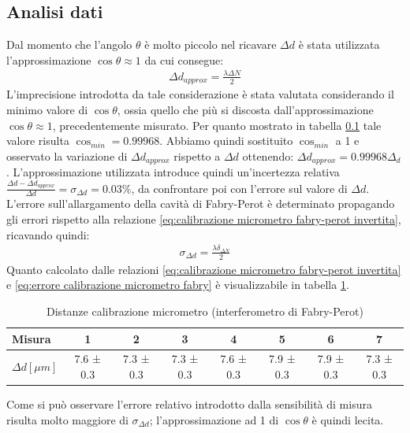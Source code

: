 \documentclass[a4paper]{article}
\begin{document}
\subsection{Analisi dati}
Dal momento che l'angolo $\theta$ è molto piccolo nel ricavare $\Delta d$ è stata utilizzata l'approssimazione $\cos{\theta}\approx1$ da cui consegue:
\begin{align}
    \Delta d_{approx} = \frac{\lambda \Delta N}{2}
\label{eq:calibrazione micrometro fabry-perot invertita}
\end{align}
L'imprecisione introdotta da tale considerazione è stata valutata considerando il minimo valore di $\cos{\theta}$, ossia quello che più si discosta dall'approssimazione $\cos{\theta}\approx1$, precedentemente misurato. Per quanto mostrato in tabella \ref{} tale valore risulta $\cos_{min}=0.99968$.
Abbiamo quindi sostituito $\cos_{min}$ a 1 e osservato la variazione di $\Delta d_{approx}$ rispetto a $\Delta d$ ottenendo: $\Delta d_{approx} = 0.99968\Delta_d$. L'approssimazione utilizzata introduce quindi un'incertezza relativa $\frac{\Delta d- \Delta d_{approx}}{\Delta d}=\sigma_{\Delta d}=0.03\%$, da confrontare poi con l'errore sul valore di $\Delta d$.
L'errore sull'allargamento della cavità di Fabry-Perot è determinato propagando gli errori rispetto alla relazione \ref{eq:calibrazione micrometro fabry-perot invertita}, ricavando quindi:
\begin{align}
   \sigma_{\Delta d}= \frac{\lambda \delta_{\Delta N}}{2}
\label{eq:errore calibrazione micrometro fabry}
\end{align}
Quanto calcolato dalle relazioni \ref{eq:calibrazione micrometro fabry-perot invertita} e \ref{eq:errore calibrazione micrometro fabry} è visualizzabile in tabella \ref{tab: distanze calibrazione fabry-perot}.
\begin{table}[htbp]
\centering
\caption{Distanze calibrazione micrometro (interferometro di Fabry-Perot)}
\begin{tabular}{|l|ccccccc|}
\hline
Misura & 1 & 2 & 3 & 4 & 5 & 6 & 7 \\\hline\hline
$\Delta d [\mu m]$ & 7.6 ± 0.3  & 7.3 ± 0.3  & 7.3 ± 0.3  & 7.6 ± 0.3  & 7.9 ± 0.3 & 7.9 ± 0.3 & 7.3 ± 0.3 \\\hline
\end{tabular}
\label{tab: distanze calibrazione fabry-perot}
\end{table}
Come si può osservare l'errore relativo introdotto dalla sensibilità di misura risulta molto maggiore di $\sigma_{\Delta d}$; l'approssimazione ad 1 di $\cos{\theta}$ è quindi lecita.
\end{document}
